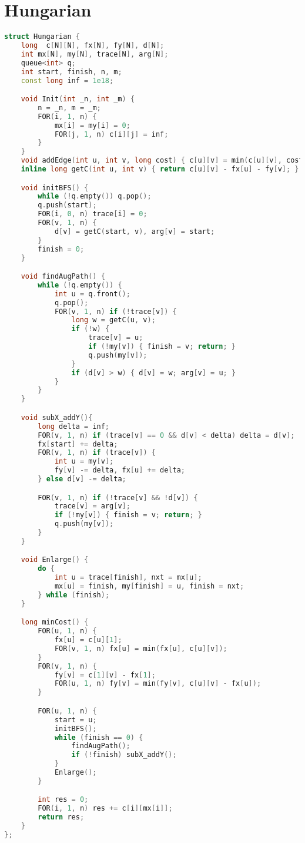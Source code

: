 \documentclass[A4 paper, 12pt]{article}
\begin{document}
	\section{Hungarian}
	\begin{lstlisting}[language=C++]
struct Hungarian {
    long  c[N][N], fx[N], fy[N], d[N];
    int mx[N], my[N], trace[N], arg[N];
    queue<int> q;
    int start, finish, n, m;
    const long inf = 1e18;

    void Init(int _n, int _m) {
        n = _n, m = _m;
        FOR(i, 1, n) {
            mx[i] = my[i] = 0;
            FOR(j, 1, n) c[i][j] = inf;
        }
    }
    void addEdge(int u, int v, long cost) { c[u][v] = min(c[u][v], cost); }
    inline long getC(int u, int v) { return c[u][v] - fx[u] - fy[v]; }

    void initBFS() {
        while (!q.empty()) q.pop();
        q.push(start);
        FOR(i, 0, n) trace[i] = 0;
        FOR(v, 1, n) {
            d[v] = getC(start, v), arg[v] = start;
        }
        finish = 0;
    }

    void findAugPath() {
        while (!q.empty()) {
            int u = q.front();
            q.pop();
            FOR(v, 1, n) if (!trace[v]) {
                long w = getC(u, v);
                if (!w) {
                    trace[v] = u;
                    if (!my[v]) { finish = v; return; }
                    q.push(my[v]);
                }
                if (d[v] > w) { d[v] = w; arg[v] = u; }
            }
        }
    }

    void subX_addY(){
        long delta = inf;
        FOR(v, 1, n) if (trace[v] == 0 && d[v] < delta) delta = d[v];  
        fx[start] += delta;
        FOR(v, 1, n) if (trace[v]) {
            int u = my[v];
            fy[v] -= delta, fx[u] += delta;
        } else d[v] -= delta;

        FOR(v, 1, n) if (!trace[v] && !d[v]) {
            trace[v] = arg[v];
            if (!my[v]) { finish = v; return; }
            q.push(my[v]);
        }
    }

    void Enlarge() {
        do {
            int u = trace[finish], nxt = mx[u];
            mx[u] = finish, my[finish] = u, finish = nxt;
        } while (finish);
    }

    long minCost() {
        FOR(u, 1, n) {
            fx[u] = c[u][1];
            FOR(v, 1, n) fx[u] = min(fx[u], c[u][v]);
        }
        FOR(v, 1, n) {
            fy[v] = c[1][v] - fx[1];
            FOR(u, 1, n) fy[v] = min(fy[v], c[u][v] - fx[u]);
        }

        FOR(u, 1, n) {
            start = u;
            initBFS();
            while (finish == 0) {
                findAugPath();
                if (!finish) subX_addY();
            }
            Enlarge();
        }

        int res = 0;
        FOR(i, 1, n) res += c[i][mx[i]];
        return res;
    }
};
\end{lstlisting}
\end{document}
